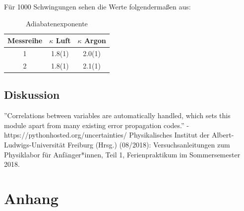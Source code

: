 \documentclass[11pt,a4paper]{article}
\begin{document}
F\"ur 1000 Schwingungen sehen die Werte folgenderma\ss en aus:

\begin{table}[h]
\centering
\renewcommand\thetable{T1}
\caption{Adiabatenexponente}
\vspace{11pt}
\begin{tabular}{ccc}
\toprule
Messreihe & $\kappa$ Luft &  $\kappa$ Argon\\
\midrule
1 & 1.8(1) & 2.0(1)\\
2 & 1.8(1) & 2.1(1)\\
\bottomrule 
\end{tabular}
\label{tab:B1}
\end{table}








\subsection{Diskussion}

\vfill

\begin{thebibliography}{9}
 ''Correlations between variables are automatically handled, which sets this module apart from many existing error propagation codes.'' - https://pythonhosted.org/uncertainties/
  Physikalisches Institut der Albert-Ludwigs-Universität Freiburg (Hrsg.) (08/2018): Versuchsanleitungen zum Physiklabor für Anfänger*innen, Teil 1, Ferienpraktikum im Sommersemester 2018.
 \end{thebibliography}

\pagebreak


\section{Anhang}
\end{document}
